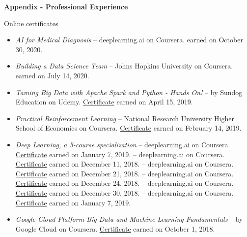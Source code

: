 \hfil{\Large{\bf Appendix - Professional Experience}}\hfil\\
\nameskip\break

\begin{rSection}{Online certificates}
  \begin{itemize}
    \item{\it AI for Medical Diagnosis} -- deeplearning.ai on Coursera.
     earned on October 30, 2020.
    \item{\it Building a Data Science Team} -- Johns Hopkins University on Coursera.
     earned on July 14, 2020.
    \item{\it Taming Big Data with Apache Spark and Python - Hands On!} -- by Sundog Education on Udemy. \href{https://www.udemy.com/certificate/UC-G53DWS5V/}{Certificate} earned on April 15, 2019.
    \item {\it Practical Reinforcement Learning} -- National Research University Higher School of Economics on Coursera. \href{https://coursera.org/share/7dbaef1de4f13d7016316a4dd7eece8a}{Certificate} earned on February 14, 2019.
    \item{\it Deep Learning, a 5-course specialization} -- deeplearning.ai on Coursera. \href{https://coursera.org/share/47b1d9ff10e34c9d26c75f5f0914379b}{Certificate} earned on January 7, 2019.
     -- deeplearning.ai on Coursera. \href{https://coursera.org/share/b99cfdbf684af876690916f62a41f74d}{Certificate} earned on December 11, 2018.
     -- deeplearning.ai on Coursera. \href{https://coursera.org/share/70436cea6ad8695c56da96f285739488}{Certificate} earned on December 21, 2018.
     -- deeplearning.ai on Coursera. \href{https://coursera.org/share/b4fec0b5c8ada28277e0369aced10c34}{Certificate} earned on December 24, 2018.
     -- deeplearning.ai on Coursera. \href{https://coursera.org/share/efaf45dddda63778f97da9aafaaa71b0}{Certificate} earned on December 30, 2018.
     -- deeplearning.ai on Coursera. \href{https://coursera.org/share/aeb503aafcd63fd9b1e098c232c6cfa4}{Certificate} earned on January 7, 2019.
    \item {\it Google Cloud Platform Big Data and Machine Learning Fundamentals} -- by Google Cloud on Coursera. \href{https://coursera.org/share/469ce1832e0392458bc6930beb44d8c6}{Certificate} earned on October 1, 2018.
  \end{itemize}
\end{rSection}

